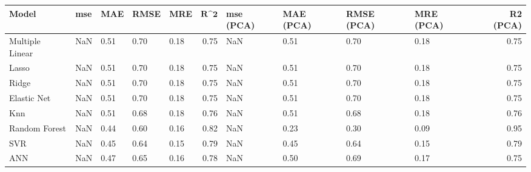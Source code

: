 \begin{table}
\centering
\label{table:iri_reg_pred}
\begin{tabular}{lllllrllllr}
\toprule
 \textbf{Model} & \textbf{mse} & \textbf{MAE} & \textbf{RMSE} & \textbf{MRE} & $\textbf{R^2}$ & \textbf{mse (PCA)} & \textbf{MAE (PCA)} & \textbf{RMSE (PCA)} & \textbf{MRE (PCA)} & \textbf{R2 (PCA)} \\
\midrule
Multiple Linear &          NaN &         0.51 &          0.70 &         0.18 &           0.75 &                NaN &               0.51 &                0.70 &               0.18 &              0.75 \\
          Lasso &          NaN &         0.51 &          0.70 &         0.18 &           0.75 &                NaN &               0.51 &                0.70 &               0.18 &              0.75 \\
          Ridge &          NaN &         0.51 &          0.70 &         0.18 &           0.75 &                NaN &               0.51 &                0.70 &               0.18 &              0.75 \\
    Elastic Net &          NaN &         0.51 &          0.70 &         0.18 &           0.75 &                NaN &               0.51 &                0.70 &               0.18 &              0.75 \\
            Knn &          NaN &         0.51 &          0.68 &         0.18 &           0.76 &                NaN &               0.51 &                0.68 &               0.18 &              0.76 \\
  Random Forest &          NaN &         0.44 &          0.60 &         0.16 &           0.82 &                NaN &               0.23 &                0.30 &               0.09 &              0.95 \\
            SVR &          NaN &         0.45 &          0.64 &         0.15 &           0.79 &                NaN &               0.45 &                0.64 &               0.15 &              0.79 \\
            ANN &          NaN &         0.47 &          0.65 &         0.16 &           0.78 &                NaN &               0.50 &                0.69 &               0.17 &              0.75 \\
\bottomrule
\end{tabular}
\end{table}
